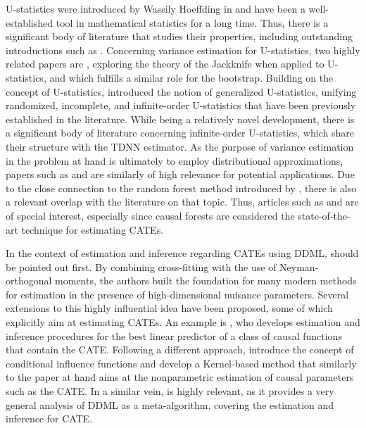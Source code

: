 U-statistics were introduced by Wassily Hoeffding in
\citet{hoeffding_class_1948} and have been a well-established tool in
mathematical statistics for a long time. Thus, there is a significant body of
literature that studies their properties, including outstanding introductions such
as \citet{lee_u-statistics_2019}. Concerning variance estimation for
U-statistics, two highly related papers are \citet{arvesen_jackknifing_1969},
exploring the theory of the Jackknife when applied to U-statistics, and
\citet{arcones_bootstrap_1992} which fulfills a similar role for the bootstrap.
Building on the concept of U-statistics, \citet{peng_rates_2022} introduced the
notion of generalized U-statistics, unifying randomized, incomplete, and
infinite-order U-statistics that have been previously established in the
literature. While being a relatively novel development, there is a significant
body of literature concerning infinite-order U-statistics, which share their
structure with the TDNN estimator. As the purpose of variance estimation in the
problem at hand is ultimately to employ distributional approximations, papers
such as \citet{chen_randomized_2019} and \citet{song_approximating_2019} are
similarly of high relevance for potential applications. Due to the close
connection to the random forest method introduced by
\citet{breiman_random_2001}, there is also a relevant overlap with the
literature on that topic. Thus, articles such as \citet{wager_confidence_2014} and
\citet{wager_estimation_2018} are of special interest, especially since causal forests are considered the state-of-the-art technique for estimating CATEs.

In the context of estimation and inference regarding CATEs using DDML, \citet{chernozhukov_doubledebiased_2018} should be pointed out first.
By combining cross-fitting with the use of Neyman-orthogonal moments, the authors built the foundation for many modern methods for estimation in the presence of high-dimensional nuisance parameters.
Several extensions to this highly influential idea have been proposed, some of which explicitly aim at estimating CATEs.
An example is \citet{semenova_debiased_2021}, who develops estimation and inference procedures for the best linear predictor of a class of causal functions that contain the CATE.
Following a different approach, \citet{chernozhukov_conditional_2024} introduce the concept of conditional influence functions and develop a Kernel-based method that similarly to the paper at hand aims at the nonparametric estimation of causal parameters such as the CATE.
In a similar vein, \citet{chernozhukov_simple_2022} is highly relevant, as it provides a very general analysis of DDML as a meta-algorithm, covering the estimation and inference for CATE.
